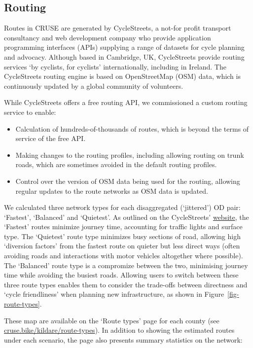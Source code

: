 \documentclass[
  super,
  preprint,
  3p]{elsarticle}
\providecommand{\tightlist}{%
  \setlength{\itemsep}{0pt}\setlength{\parskip}{0pt}}\usepackage{longtable,booktabs,array}
\begin{document}
\hypertarget{routing}{%
\subsection{Routing}\label{routing}}

Routes in CRUSE are generated by CycleStreets, a not-for profit
transport consultancy and web development company who provide
application programming interfaces (APIs) supplying a range of datasets
for cycle planning and advocacy. Although based in Cambridge, UK,
CycleStreets provide routing services `by cyclists, for cyclists'
internationally, including in Ireland. The CycleStreets routing engine
is based on OpenStreetMap (OSM) data, which is continuously updated by a
global community of volunteers.

While CycleStreets offers a free routing API, we commissioned a custom
routing service to enable:

\begin{itemize}
\tightlist
\item
  Calculation of hundreds-of-thousands of routes, which is beyond the
  terms of service of the free API.
\item
  Making changes to the routing profiles, including allowing routing on
  trunk roads, which are sometimes avoided in the default routing
  profiles.
\item
  Control over the version of OSM data being used for the routing,
  allowing regular updates to the route networks as OSM data is updated.
\end{itemize}

We calculated three network types for each disaggregated (`jittered') OD
pair: `Fastest', `Balanced' and `Quietest'. As outlined on the
CycleStreets'
\href{https://www.cyclestreets.net/help/journey/howitworks/}{website},
the `Fastest' routes minimize journey time, accounting for traffic
lights and surface type. The `Quietest' route type minimizes busy
sections of road, allowing high `diversion factors' from the fastest
route on quieter but less direct ways (often avoiding roads and
interactions with motor vehicles altogether where possible). The
`Balanced' route type is a compromize between the two, minimising
journey time while avoiding the busiest roads. Allowing users to switch
between these three route types enables them to consider the trade-offs
between directness and `cycle friendliness' when planning new
infrastructure, as shown in Figure~\ref{fig-route-types}.

These map are available on the `Route types' page for each county (see
\href{https://cruse.bike/kildare/route-types}{cruse.bike/kildare/route-types}).
In addition to showing the estimated routes under each scenario, the
page also presents summary statistics on the network:
\end{document}
